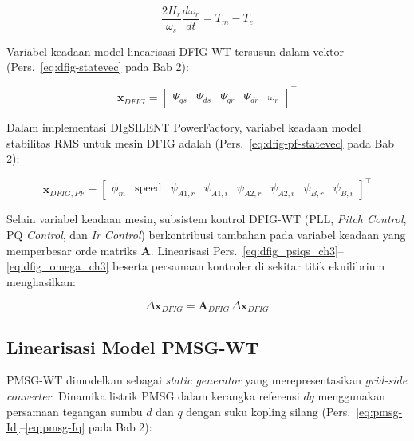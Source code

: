 \begin{equation}
    \frac{2H_r}{\omega_s}\frac{d\omega_r}{dt} = T_m - T_e
    \label{eq:dfig_omega_ch3}
\end{equation}

Variabel keadaan model linearisasi DFIG-WT tersusun dalam vektor
(Pers.~\ref{eq:dfig-statevec} pada Bab 2):

\begin{equation}
    \mathbf{x}_{DFIG} =
    \begin{bmatrix}\Psi_{qs} & \Psi_{ds} & \Psi_{qr} & \Psi_{dr} & \omega_r\end{bmatrix}^\top
    \label{eq:dfig_state_ch3}
\end{equation}

Dalam implementasi DIgSILENT PowerFactory, variabel keadaan model stabilitas RMS
untuk mesin DFIG adalah (Pers.~\ref{eq:dfig-pf-statevec} pada Bab 2):

\begin{equation}
    \mathbf{x}_{DFIG,PF} =
    \begin{bmatrix}\phi_m & \mathrm{speed} &
        \psi_{A1,r} & \psi_{A1,i} &
        \psi_{A2,r} & \psi_{A2,i} &
        \psi_{B,r}  & \psi_{B,i}
    \end{bmatrix}^\top
    \label{eq:dfig_pf_state_ch3}
\end{equation}

Selain variabel keadaan mesin, subsistem kontrol DFIG-WT (PLL, \textit{Pitch
Control}, PQ \textit{Control}, dan \textit{Ir Control}) berkontribusi tambahan
pada variabel keadaan yang memperbesar orde matriks $\mathbf{A}$. Linearisasi
Pers.~\eqref{eq:dfig_psiqs_ch3}--\eqref{eq:dfig_omega_ch3} beserta persamaan
kontroler di sekitar titik ekuilibrium menghasilkan:

\begin{equation}
    \Delta\dot{\mathbf{x}}_{DFIG} = \mathbf{A}_{DFIG}\,\Delta\mathbf{x}_{DFIG}
    \label{eq:dfig_linear_ch3}
\end{equation}

\subsection{Linearisasi Model PMSG-WT}

PMSG-WT dimodelkan sebagai \textit{static generator} yang merepresentasikan
\textit{grid-side converter}. Dinamika listrik PMSG dalam kerangka referensi
$dq$ menggunakan persamaan tegangan sumbu $d$ dan $q$ dengan suku kopling
silang (Pers.~\ref{eq:pmsg-Id}--\ref{eq:pmsg-Iq} pada Bab 2):

